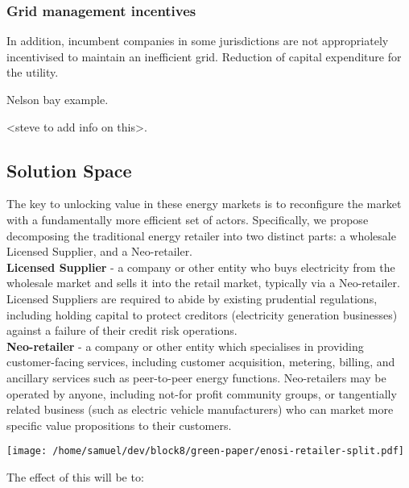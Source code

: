 \documentclass{article}
\theoremstyle{definition}
\theoremstyle{plain} %
\begin{document}
\subsubsection{Grid management incentives}

In addition, incumbent companies in some jurisdictions are not appropriately incentivised to maintain an inefficient grid. Reduction of capital expenditure for the utility.

Nelson bay example.

<steve to add info on this>.

\subsection{Solution Space}

The key to unlocking value in these energy markets is to reconfigure the market with a fundamentally more efficient set of actors. Specifically, we propose decomposing the traditional energy retailer into two distinct parts: a wholesale Licensed Supplier, and a Neo-retailer.\\

\noindent \textbf{Licensed Supplier} - a company or other entity who buys electricity from the wholesale market and sells it into the retail market, typically via a Neo-retailer. Licensed Suppliers are required to abide by existing prudential regulations, including holding capital to protect creditors (electricity generation businesses) against a failure of their credit risk operations.\\

\noindent \textbf{Neo-retailer} - a company or other entity which specialises in providing customer-facing services, including customer acquisition, metering, billing, and ancillary services such as peer-to-peer energy functions. Neo-retailers may be operated by anyone, including not-for profit community groups, or tangentially related business (such as electric vehicle manufacturers) who can market more specific value propositions to their customers.\\

\vspace{2mm}

\begin{center}
\texttt{[image: /home/samuel/dev/block8/green-paper/enosi-retailer-split.pdf]}\\
\end{center}


\noindent The effect of this will be to:
\end{document}

